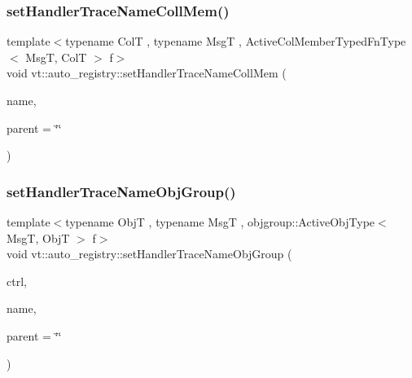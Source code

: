 \subsubsection{\texorpdfstring{set\+Handler\+Trace\+Name\+Coll\+Mem()}{setHandlerTraceNameCollMem()}}
{\footnotesize\ttfamily template$<$typename ColT , typename MsgT , Active\+Col\+Member\+Typed\+Fn\+Type$<$ Msg\+T, Col\+T $>$ f$>$ \\
void vt\+::auto\+\_\+registry\+::set\+Handler\+Trace\+Name\+Coll\+Mem (\begin{DoxyParamCaption}\item[{std\+::string const \&}]{name,  }\item[{std\+::string const \&}]{parent = {\ttfamily \char`\"{}\char`\"{}} }\end{DoxyParamCaption})}

\mbox{\label{namespacevt_1_1auto__registry_a1eb25883c6f5332dbbf4a61bd22bbf2f}} 
\subsubsection{\texorpdfstring{set\+Handler\+Trace\+Name\+Obj\+Group()}{setHandlerTraceNameObjGroup()}}
{\footnotesize\ttfamily template$<$typename ObjT , typename MsgT , objgroup\+::\+Active\+Obj\+Type$<$ Msg\+T, Obj\+T $>$ f$>$ \\
void vt\+::auto\+\_\+registry\+::set\+Handler\+Trace\+Name\+Obj\+Group (\begin{DoxyParamCaption}\item[{\hyperlink{namespacevt_adbbef13b92f0a93b14c219b7cc8a48f2}{Handler\+Control\+Type}}]{ctrl,  }\item[{std\+::string const \&}]{name,  }\item[{std\+::string const \&}]{parent = {\ttfamily \char`\"{}\char`\"{}} }\end{DoxyParamCaption})}

